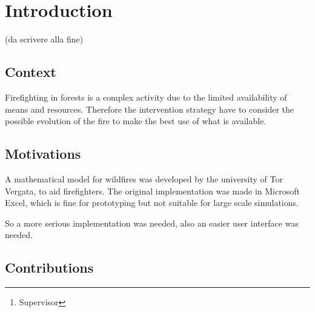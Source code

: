 \documentclass[draft]{article}
\title{\mytitle}
\date{2021}
\author{Diego Bellani\and Enrico Tronci\thanks{Supervisor}}
\begin{document}
\begin{titlepage}
	\maketitle

	\begin{abstract}
	(Max one page, da scrivere alla fine)
	\end{abstract}

	\iffalse
	\tableofcontents
	\listoffigures
	\listoftables
	\fi
\end{titlepage}


\section{Introduction}\label{sec:intro}

(da scrivere alla fine)

\subsection{Context}\label{sec:context}

Firefighting in forests is a complex activity due to the limited availability of
means and resources. Therefore the intervention strategy have to consider the
possible evolution of the fire to make the best use of what is available.

\subsection{Motivations}\label{sec:motivations}

A mathematical model for wildfires was developed by the university of Tor
Vergata, to aid firefighters. The original implementation was made in Microsoft
Excel\textsuperscript{\textregistered}, which is fine for prototyping but not
suitable for large scale simulations.

So a more serious implementation was needed, also an easier user interface was
needed.

\iffalse
Describe what is missing and instead would be useful to have\dots Non ne ho la
minima idea. Also Modelica did not made the cut.
\fi

\subsection{Contributions}\label{sec:contrib}
\end{document}
